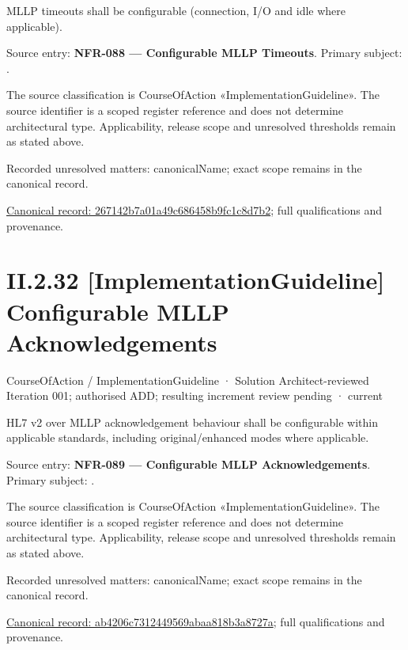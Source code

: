 MLLP timeouts shall be configurable (connection, I/O and idle where applicable).



Source entry: \textbf{NFR-088 — Configurable MLLP Timeouts}. Primary subject: \texttt{}.



The source classification is CourseOfAction «ImplementationGuideline». The source identifier is a scoped register reference and does not determine architectural type. Applicability, release scope and unresolved thresholds remain as stated above.


{\small Recorded unresolved matters: canonicalName; exact scope remains in the canonical record.}\par
{\footnotesize \href{../../../../../../../continuum/strategy/course-of-action/implementation-guideline/267142b7a01a49c686458b9fc1c8d7b2.md}{Canonical record: 267142b7a01a49c686458b9fc1c8d7b2}; full qualifications and provenance.}\par
\section*{II.2.32 [ImplementationGuideline] Configurable MLLP Acknowledgements}
\label{navigation:II.2.32}

\label{element:ab4206c7312449569abaa818b3a8727a}
{\small CourseOfAction / ImplementationGuideline · Solution Architect-reviewed Iteration 001; authorised ADD; resulting increment review pending · current}\par

HL7 v2 over MLLP acknowledgement behaviour shall be configurable within applicable standards, including original/enhanced modes where applicable.



Source entry: \textbf{NFR-089 — Configurable MLLP Acknowledgements}. Primary subject: \texttt{}.



The source classification is CourseOfAction «ImplementationGuideline». The source identifier is a scoped register reference and does not determine architectural type. Applicability, release scope and unresolved thresholds remain as stated above.


{\small Recorded unresolved matters: canonicalName; exact scope remains in the canonical record.}\par
{\footnotesize \href{../../../../../../../continuum/strategy/course-of-action/implementation-guideline/ab4206c7312449569abaa818b3a8727a.md}{Canonical record: ab4206c7312449569abaa818b3a8727a}; full qualifications and provenance.}\par
